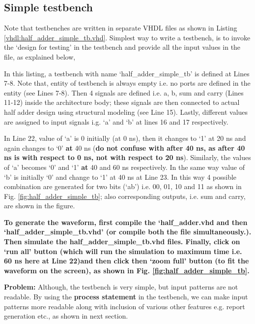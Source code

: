 


\subsection{Simple testbench}

Note that testbenches are written in separate VHDL files as shown in Listing \ref{vhdl:half_adder_simple_tb.vhd}. Simplest way to write a testbench, is to invoke the `design for testing' in the testbench and provide all the input values in the file,  as explained below, 

\begin{explanation}
	In this listing, a testbench with name `half\_adder\_simple\_tb' is defined at Lines 7-8. Note that, entity of testbench is always empty i.e. no ports are defined in the entity (see Lines 7-8). Then 4 signals are defined i.e. a, b, sum and carry (Lines 11-12) inside the architecture body; these signals are then connected to actual half adder design using structural modeling (see Line 15). Lastly, different values are assigned to input signals i.g. `a' and `b' at lines 16 and 17 respectively. 
	
	In Line 22, value of `a' is 0 initially (at 0 ns), then it changes to `1' at 20 ns and again changes to `0' \textbf{at} 40 ns (\textbf{do not confuse with after 40 ns, as after 40 ns is with respect to 0 ns, not with respect to 20 ns}). Similarly, the values of `a' becomes `0' and `1' \textbf{at} 40 and 60 ns respectively. In the same way value of `b' is initially `0' and change to `1' at 40 ns at Line 23. In this way 4 possible combination are generated for two bits (`ab') i.e. 00, 01, 10 and 11 as shown in Fig. \ref{fig:half_adder_simple_tb}; also corresponding outputs, i.e. sum and carry, are shown in the figure. 
	
	\textbf{To generate the waveform, first compile the `half\_adder.vhd and then `half\_adder\_simple\_tb.vhd' (or compile both the file simultaneously.). Then simulate the half\_adder\_simple\_tb.vhd files. Finally, click on `run all' button (which will run the simulation to maximum time i.e. 60 ns here at Line 22)and then click then `zoom full' button (to fit the waveform on the screen), as shown in Fig. \ref{fig:half_adder_simple_tb}.}
\end{explanation}

\textbf{Problem: } Although, the testbench is very simple, but input patterns are not readable. By using the \textbf{process statement} in the testbench, we can make input patterns more readable along with inclusion  of various other features e.g. report generation etc., as shown in next section. 

